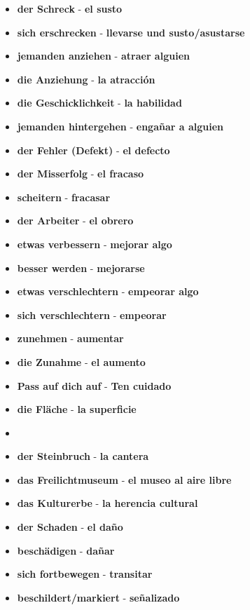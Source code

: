 \documentclass{article}
\begin{document}
\begin{multicols}{2}
\begin{itemize}
		\item{\textbf{der Schreck} - \textbf{el susto}}
		\item{\textbf{sich erschrecken} - \textbf{llevarse und susto/asustarse}}
		\item{\textbf{jemanden anziehen} - \textbf{atraer alguien}}
		\item{\textbf{die Anziehung} - \textbf{la atracción}}
		\item{\textbf{die Geschicklichkeit} - \textbf{la habilidad}}
		\item{\textbf{jemanden hintergehen} - \textbf{engañar a alguien}}
		\item{\textbf{der Fehler (Defekt)} - \textbf{el defecto}}
		\item{\textbf{der Misserfolg} - \textbf{el fracaso}}
		\item{\textbf{scheitern} - \textbf{fracasar}}
		\item{\textbf{der Arbeiter} - \textbf{el obrero}}
		\item{\textbf{etwas verbessern} - \textbf{mejorar algo}}
		\item{\textbf{besser werden} - \textbf{mejorarse}}
		\item{\textbf{etwas verschlechtern} - \textbf{empeorar algo}}
		\item{\textbf{sich verschlechtern} - \textbf{empeorar}}
		\item{\textbf{zunehmen} - \textbf{aumentar}}
		\item{\textbf{die Zunahme} - \textbf{el aumento}}
		\item{\textbf{Pass auf dich auf} - \textbf{Ten cuidado}}
	\end{itemize}
	\newpage
	\begin{itemize}
		\item{\textbf{die Fläche} - \textbf{la superficie}}
		\item{\textbf{}}
		\item{\textbf{der Steinbruch} - \textbf{la cantera}}
		\item{\textbf{das Freilichtmuseum} - \textbf{el museo al aire libre}}
		\item{\textbf{das Kulturerbe} - \textbf{la herencia cultural}}
		\item{\textbf{der Schaden} - \textbf{el daño}}
		\item{\textbf{beschädigen} - \textbf{dañar}}
		\item{\textbf{sich fortbewegen} - \textbf{transitar}}
		\item{\textbf{beschildert/markiert} - \textbf{señalizado}}

\end{itemize}
\end{multicols}
\end{document}
